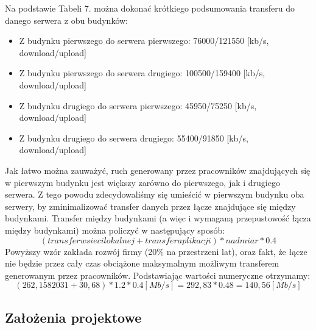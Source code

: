 \documentclass[a4paper, 12pt]{article}
\begin{document}
Na podstawie Tabeli 7. można dokonać krótkiego podsumowania transferu do danego serwera z obu budynków:
\begin{itemize}
\item Z budynku pierwszego do serwera pierwszego: 76000/121550 [kb/s, download/upload]
\item Z budynku pierwszego do serwera drugiego: 100500/159400 [kb/s, download/upload]
\item Z budynku drugiego do serwera pierwszego: 45950/75250 [kb/s, download/upload]
\item Z budynku drugiego do serwera drugiego: 55400/91850 [kb/s, download/upload]
\end{itemize}

Jak łatwo można zauważyć, ruch generowany przez pracowników znajdujących się w pierwszym budynku jest większy zarówno do pierwszego, jak i drugiego serwera. Z tego powodu zdecydowaliśmy się umieścić w pierwszym budynku oba serwery, by zminimalizować transfer danych przez łącze znajdujące się między budynkami. Transfer między budynkami (a więc i wymaganą przepustowość łącza między budynkami) można policzyć w następujący sposób:
\[(transfer w sieci lokalnej + transfer aplikacji) * nadmiar * 0.4\]
\indent Powyższy wzór zakłada rozwój firmy (20$\%$ na przestrzeni lat), oraz fakt, że łącze nie będzie przez cały czas obciążone maksymalnym możliwym transferem generowanym przez pracowników. Podstawiając wartości numeryczne otrzymamy:
\[(262,1582031 + 30,68) * 1.2 * 0.4 [Mb/s]= 292,83 * 0.48 = 140,56 [Mb/s]\]

\subsection{Założenia projektowe}
\end{document}
